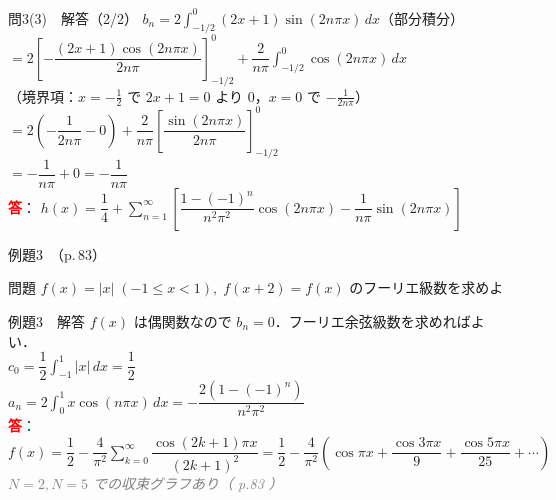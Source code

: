 \documentclass[professionalfonts]{beamer}
\begin{document}
\begin{frame}{問3(3)　解答（2/2）}
  $b_{n}=2\displaystyle\int_{-1/2}^{0}(2x+1)\sin(2n\pi x)\,dx$\quad（部分積分）\\[4pt]
  $=2\!\left[-\dfrac{(2x+1)\cos(2n\pi x)}{2n\pi}\right]_{-1/2}^{0}
   +\dfrac{2}{n\pi}\displaystyle\int_{-1/2}^{0}\cos(2n\pi x)\,dx$\\[2pt]
  {\footnotesize（境界項：$x=-\tfrac{1}{2}$ で $2x+1=0$ より 0，$x=0$ で $-\tfrac{1}{2n\pi}$）}\\[2pt]
  $=2\!\left(-\dfrac{1}{2n\pi}-0\right)+\dfrac{2}{n\pi}\!\left[\dfrac{\sin(2n\pi x)}{2n\pi}\right]_{-1/2}^{0}$\\[4pt]
  $=-\dfrac{1}{n\pi}+0=-\dfrac{1}{n\pi}$
  \\[8pt]\textcolor{red}{\textbf{答}}：
  $h(x) = \dfrac{1}{4} + \displaystyle\sum_{n=1}^\infty\!\left[\dfrac{1-(-1)^n}{n^{2}\pi^{2}}\cos(2n\pi x) - \dfrac{1}{n\pi}\sin(2n\pi x)\right]$\\
\end{frame}

\begin{frame}{例題3　（p.\,83）}
  \begin{exampleblock}{問題}
    $f(x) = |x| \; (-1 \leq x < 1),\; f(x+2) = f(x)$ のフーリエ級数を求めよ\\[2pt]
  \end{exampleblock}
\end{frame}

\begin{frame}{例題3　解答}
  $f(x)$ は偶関数なので $b_{n} = 0$．フーリエ余弦級数を求めればよい．\\[4pt]
  $c_{0} = \dfrac{1}{2}\displaystyle\int_{-1}^{1} |x|\,dx = \dfrac{1}{2}$\\[6pt]
  $a_{n} = 2\displaystyle\int_{0}^{1} x \cos(n\pi x)\,dx = -\dfrac{2(1-(-1)^n)}{n^{2}\pi^{2}}$
  \\[8pt]\textcolor{red}{\textbf{答}}：$f(x) = \dfrac{1}{2} - \dfrac{4}{\pi^{2}}\displaystyle\sum_{k=0}^{\infty} \dfrac{\cos(2k+1)\pi x}{(2k+1)^{2}} = \dfrac{1}{2} - \dfrac{4}{\pi^{2}}\!\left(\cos \pi x + \dfrac{\cos 3\pi x}{9} + \dfrac{\cos 5\pi x}{25} + \cdots\right)$
  {\footnotesize \textcolor{gray}{\textit{$N=2, N=5$ での収束グラフあり（ p.83 ）}}}
\end{frame}
\end{document}
